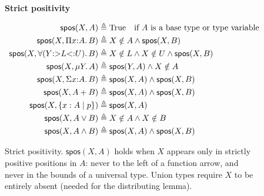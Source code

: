 \begin{figure}[t]
\small
\noindent\textbf{Strict positivity} \hfill {}

\vspace{0.5em}
\begin{math}
\begin{array}{r@{\;}c@{\;}l}
  \textsf{spos}(X, A) &\triangleq& \mathrm{True} \quad \text{if $A$ is a base type or type variable}
  \\[0.3em]
  \textsf{spos}(X, \Pi x{:}A.\, B) &\triangleq& X \notin A \land \textsf{spos}(X, B)
  \\[0.3em]
  \textsf{spos}(X, \forall (Y {:>} L {<:} U).\, B) &\triangleq& X \notin L \land X \notin U \land \textsf{spos}(X, B)
  \\[0.3em]
  \textsf{spos}(X, \mu Y.\, A) &\triangleq& \textsf{spos}(Y, A) \land X \notin A
  \\[0.3em]
  \textsf{spos}(X, \Sigma x{:}A.\, B) &\triangleq& \textsf{spos}(X, A) \land \textsf{spos}(X, B)
  \\[0.3em]
  \textsf{spos}(X, A + B) &\triangleq& \textsf{spos}(X, A) \land \textsf{spos}(X, B)
  \\[0.3em]
  \textsf{spos}(X, \{x : A \mid p\}) &\triangleq& \textsf{spos}(X, A)
  \\[0.3em]
  \textsf{spos}(X, A \lor B) &\triangleq& X \notin A \land X \notin B
  \\[0.3em]
  \textsf{spos}(X, A \land B) &\triangleq& \textsf{spos}(X, A) \land \textsf{spos}(X, B)
\end{array}
\end{math}

\vspace{0.5em}
\caption{Strict positivity. $\textsf{spos}(X, A)$ holds when $X$ appears only in strictly positive positions in $A$: never to the left of a function arrow, and never in the bounds of a universal type. Union types require $X$ to be entirely absent (needed for the distributing lemma).}\label{fig:spos}
\end{figure}

